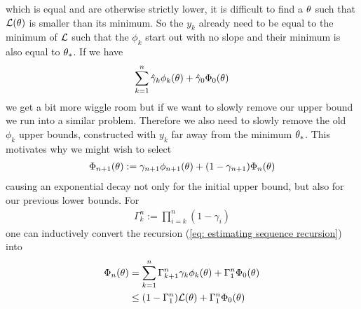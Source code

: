 which is equal and are otherwise strictly lower, it is difficult to find
a \(\theta\) such that \(\mathcal{L}(\theta)\) is smaller than its minimum.
So the \(y_k\) already need to be equal to the minimum
of \(\mathcal{L}\) such that the \(\phi_k\) start out with no slope and their
minimum is also equal to \(\theta_*\). If we have
\begin{align*}
	\sum_{k=1}^n \hat{\gamma}_k \phi_k(\theta)
	+ \hat{\gamma}_0 \Phi_0(\theta)
\end{align*}
we get a bit more wiggle room but if we want to slowly remove our upper bound
we run into a similar problem. Therefore we also need to slowly remove the old
\(\phi_k\) upper bounds, constructed with \(y_k\) far away from the minimum
\(\theta_*\). This motivates why we might wish to select
\begin{align}\label{eq: estimating sequence recursion}
	\Phi_{n+1}(\theta) := \gamma_{n+1} \phi_{n+1}(\theta) + (1-\gamma_{n+1})\Phi_n(\theta)
\end{align}
causing an exponential decay not only for the initial upper bound, but also for
our previous lower bounds. For
\begin{align*}
	\Gamma_k^n := \prod_{i=k}^n (1-\gamma_i)
\end{align*}
one can inductively convert the recursion (\ref{eq: estimating sequence
recursion}) into
\begin{align}
	\nonumber
	\Phi_n(\theta)
	&= \sum_{k=1}^n \Gamma_{k+1}^n\gamma_k \phi_k(\theta)
	+ \Gamma_1^n\Phi_0(\theta) \\
	\label{eq: estimating sequence explicit}
	&\le (1-\Gamma_1^n)\mathcal{L}(\theta) + \Gamma_1^n\Phi_0(\theta)
\end{align}


